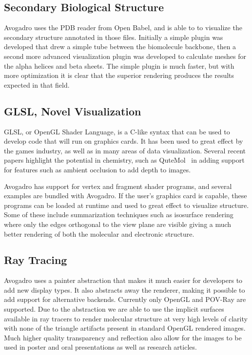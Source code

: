 \documentclass[10pt]{bmc_article}
\newenvironment{bmcformat}{\begin{raggedright}
\baselineskip20pt\sloppy\setboolean{publ}{false}}{\end{raggedright}
\baselineskip20pt\sloppy}
\begin{document}
\begin{bmcformat}
\subsection{Secondary Biological Structure}

Avogadro uses the PDB reader from Open Babel, and is able to to visualize the
secondary structure annotated in those files. Initially a simple plugin was
developed that drew a simple tube between the biomolecule backbone, then a
second more advanced visualization plugin was developed to calculate meshes for
the alpha helices and beta sheets. The simple plugin is much faster, but with
more optimization it is clear that the superior rendering produces the results
expected in that field.

\subsection{GLSL, Novel Visualization}

GLSL, or OpenGL Shader Language, is a C-like syntax that can be used to develop
code that will run on graphics cards. It has been used to great effect by the
games industry, as well as in many areas of data visualization. Several recent
papers highlight the potential in chemistry, such as QuteMol~\cite{QuteMol} in
adding support for features such as ambient occlusion to add depth to images.

Avogadro has support for vertex and fragment shader programs, and several
examples are bundled with Avogadro. If the user's graphics card is capable,
these programs can be loaded at runtime and used to great effect to visualize
structure. Some of these include summarization techniques such as isosurface
rendering where only the edges orthogonal to the view plane are visible giving
a much better rendering of both the molecular and electronic structure.

\subsection{Ray Tracing}

Avogadro uses a painter abstraction that makes it much easier for developers to
add new display types. It also abstracts away the renderer, making it possible
to add support for alternative backends. Currently only OpenGL and POV-Ray are
supported. Due to the abstraction we are able to use the implicit surfaces
available in ray tracers to render molecular structure at very high levels of
clarity with none of the triangle artifacts present in standard OpenGL rendered
images. Much higher quality transparency and reflection also allow for the
images to be used in poster and oral presentations as well as research
articles.


\end{bmcformat}
\end{document}
